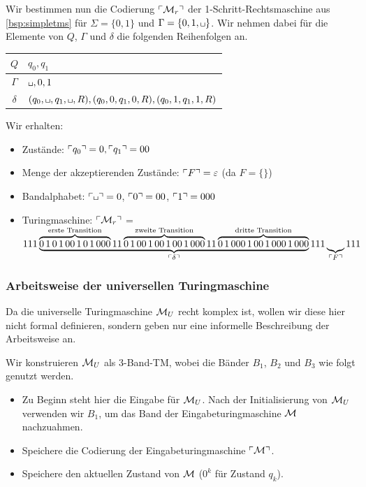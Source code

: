 \begin{Bsp}\label{bsp:CodeVonMr}
	Wir bestimmen nun die Codierung $\ulcorner \mathcal{M}_r \urcorner$ der 1-Schritt-Rechtsmaschine aus \autoref{bsp:simpletms} für $\Sigma = \{0, 1\}$ und $\Gamma = \{0, 1, \blank\}$.
	Wir nehmen dabei für die Elemente von $Q$, $\Gamma$ und $\delta$ die folgenden Reihenfolgen an.
	
	\begin{center}
	\begin{tabular}{c|l}
    $Q$ & $q_0,q_1$\\ \hline
    $\Gamma$ & $\blank, 0, 1$\\ \hline
    $\delta$ & $(q_0, \blank, q_1, \blank, R), (q_0, 0, q_1, 0, R), (q_0, 1, q_1, 1, R)$
	\end{tabular}
	\end{center}
	Wir erhalten:
	\begin{itemize}
		\item Zustände: $\ulcorner q_0 \urcorner = 0, \ulcorner q_1 \urcorner = 00$
		
		\item Menge der akzeptierenden Zustände: $\ulcorner F \urcorner = \varepsilon$ (da $F = \{\}$)
		
		\item Bandalphabet: $\godel{\blank} = 0$, $\ulcorner 0 \urcorner = 00$, $\ulcorner 1 \urcorner = 000$
	
		\item Turingmaschine: $\ulcorner \mathcal{M}_r \urcorner$ = \\ $111 \underbrace{\overbrace{0\,1\,0\,1\,00\,1\,0\,1\,000}^\text{erste Transition} 11 \overbrace{0\,1\,00\,1\,00\,1\,00\,1\,000}^\text{zweite Transition} 11 \overbrace{0\,1\,000\,1\,00\,1\,000\,1\,000}^\text{dritte Transition}}_{\ulcorner \delta \urcorner}111\underbrace{\,}_{\ulcorner F \urcorner}111$
		\qedhere
	\end{itemize}
\end{Bsp}



\subsubsection{Arbeitsweise der universellen Turingmaschine}
Da die universelle Turingmaschine $\mathcal{M}_U$ recht komplex ist, wollen wir diese hier nicht formal definieren, sondern geben nur eine informelle Beschreibung der Arbeitsweise an.


Wir konstruieren $\mathcal{M}_U$ als 3-Band-\ac{TM}, wobei die Bänder $B_1$, $B_2$ und $B_3$ wie folgt genutzt werden.
\begin{itemize}
\item[$B_1:$] Zu Beginn steht hier die Eingabe für $\mathcal{M}_U$.
Nach der Initialisierung von $\mathcal{M}_U$ verwenden wir $B_1$, um das Band der Eingabeturingmaschine $\mathcal{M}$ nachzuahmen.
\item[$B_2:$] Speichere die Codierung der Eingabeturingmaschine $\ulcorner \mathcal{M} \urcorner$.
\item[$B_3:$] Speichere den aktuellen Zustand von $\mathcal{M}$ ($0^k$ für Zustand $q_k$).
\end{itemize}


